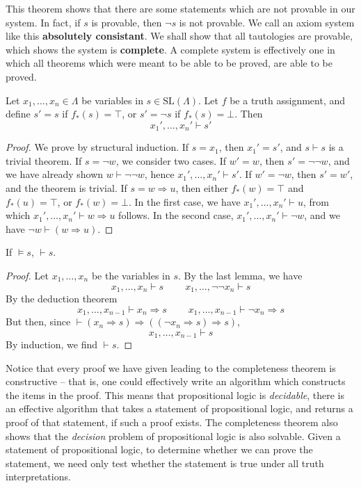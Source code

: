 This theorem shows that there are some statements which are not provable in our system. In fact, if $s$ is provable, then $\neg s$ is not provable. We call an axiom system like this {\bf absolutely consistant}. We shall show that all tautologies are provable, which shows the system is {\bf complete}. A complete system is effectively one in which all theorems which were meant to be able to be proved, are able to be proved.

\begin{lemma}
    Let $x_1, \dots, x_n \in \Lambda$ be variables in $s \in \text{SL}(\Lambda)$. Let $f$ be a truth assignment, and define $s' = s$ if $f_*(s) = \top$, or $s' = \neg s$ if $f_*(s) = \bot$. Then
    \[ x_1', \dots, x_n' \vdash s' \]
\end{lemma}
\begin{proof}
    We prove by structural induction. If $s = x_1$, then $x_1' = s'$, and $s \vdash s$ is a trivial theorem. If $s = \neg w$, we consider two cases. If $w' = w$, then $s' = \neg \neg w$, and we have already shown $w \vdash \neg \neg w$, hence $x_1', \dots, x_n' \vdash s'$. If $w' = \neg w$, then $s' = w'$, and the theorem is trivial. If $s = w \Rightarrow u$, then either $f_*(w) = \top$ and $f_*(u) = \top$, or $f_*(w) = \bot$. In the first case, we have $x_1', \dots, x_n' \vdash u$, from which $x_1', \dots, x_n' \vdash w \Rightarrow u$ follows. In the second case, $x_1', \dots, x_n' \vdash \neg w$, and we have $\neg w \vdash (w \Rightarrow u)$.
\end{proof}

\begin{corollary}
    If $\vDash s$, $\vdash s$.
\end{corollary}
\begin{proof}
    Let $x_1, \dots, x_n$ be the variables in $s$. By the last lemma, we have
    \[ x_1, \dots, x_n \vdash s\ \ \ \ \ \ \ \ \ \ x_1, \dots, \neg \neg x_n \vdash s \]
    By the deduction theorem
    \[ x_1, \dots, x_{n-1} \vdash x_n \Rightarrow s\ \ \ \ \ \ \ \ \ \ x_1, \dots, x_{n-1} \vdash \neg x_n \Rightarrow s \]
    But then, since $\vdash (x_n \Rightarrow s) \Rightarrow ((\neg x_n \Rightarrow s) \Rightarrow s)$,
    \[ x_1, \dots, x_{n-1} \vdash s \]
    By induction, we find $\vdash s$.
\end{proof}

Notice that every proof we have given leading to the completeness theorem is constructive -- that is, one could effectively write an algorithm which constructs the items in the proof. This means that propositional logic is {\it decidable}, there is an effective algorithm that takes a statement of propositional logic, and returns a proof of that statement, if such a proof exists. The completeness theorem also shows that the {\it decision} problem of propositional logic is also solvable. Given a statement of propositional logic, to determine whether we can prove the statement, we need only test whether the statement is true under all truth interpretations.

